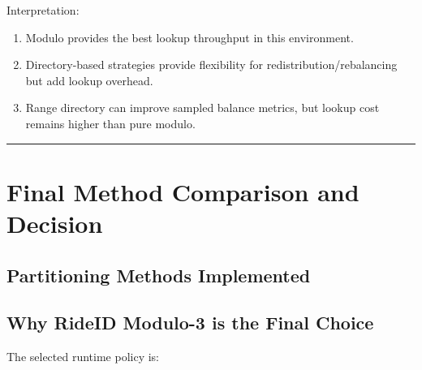 \documentclass[12pt]{article}
\begin{document}
Interpretation:
\begin{enumerate}
    \item Modulo provides the best lookup throughput in this environment.
    \item Directory-based strategies provide flexibility for redistribution/rebalancing but add lookup overhead.
    \item Range directory can improve sampled balance metrics, but lookup cost remains higher than pure modulo.
\end{enumerate}

\hrule
\vspace{0.75em}

\section{Final Method Comparison and Decision}

\subsection{Partitioning Methods Implemented}

\begin{table}[H]
\centering
\begin{minipage}{\textwidth}
\centering
{}
\end{minipage}
\end{table}

\subsection{Why RideID Modulo-3 is the Final Choice}

The selected runtime policy is:
\end{document}
